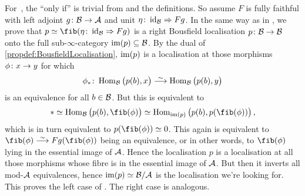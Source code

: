 \documentclass[a4paper, 10pt, oneside, DIV=9, chapterprefix=true, numbers=enddot,bibliography=totoc]{scrbook}
\begin{document}
\begin{proof*}
	For~, the \enquote{only if} is trivial from  and the definitions. So assume $F$ is fully faithful with left adjoint $g\colon \Bb\morphism \Aa$ and unit $\eta\colon \operatorname{id}_{\mathcal{B}}\Rightarrow Fg$. In the same way as in , we prove that $p\simeq \fib(\eta\colon \id_\Bb\Rightarrow Fg)$ is a right Bousfield localisation $p\colon \Bb\morphism\Bb$ onto the full sub-$\infty$-category $\operatorname{im}(p)\subseteq \mathcal{B}$. By the dual of \cref{propdef:BousfieldLocalisation}, $\operatorname{im}(p)$ is a localisation at those morphisms $\phi\colon x\morphism y$ for which 
	\begin{equation*}
		\phi_*\colon \Hom_\Bb\big(p(b),x\big)\isomorphism \Hom_\Bb\big(p(b),y\big)
	\end{equation*}
	is an equivalence for all $b\in \mathcal{B}$. But this is equivalent to
	\begin{equation*}
		*\simeq \Hom_\Bb\big(p(b),\fib(\phi)\big)\simeq \Hom_{\im(p)}\big(p(b),p(\fib(\phi))\big)\,,
	\end{equation*}
	which is in turn equivalent to $p(\fib(\phi))\simeq 0$. This again is equivalent to $\fib(\phi)\isomorphism Fg(\fib(\phi))$ being an equivalence, or in other words, to $\fib(\phi)$ lying in the essential image of $\mathcal{A}$. Hence the localisation $p$ is a localisation at all those morphisms whose fibre is in the essential image of $\mathcal{A}$. But then it inverts all mod-$\mathcal{A}$ equivalences, hence $\operatorname{im}(p)\simeq \mathcal{B}/\mathcal{A}$ is the localisation we're looking for. This proves the left case of . The right case is analogous.
	

\end{proof*}
\end{document}
